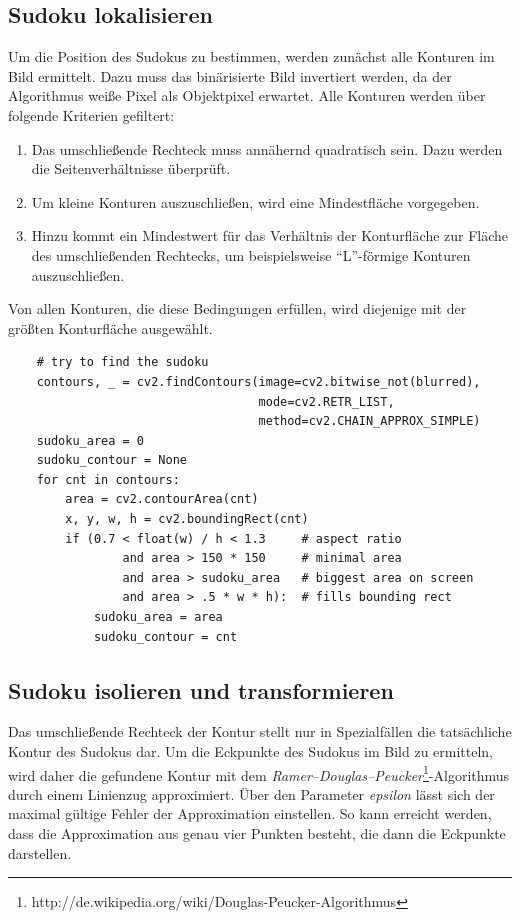 \subsection{Sudoku lokalisieren}
Um die Position des Sudokus zu bestimmen, werden zunächst alle Konturen im Bild ermittelt.
Dazu muss das binärisierte Bild invertiert werden, da der Algorithmus weiße Pixel als Objektpixel erwartet.
Alle Konturen werden über folgende Kriterien gefiltert:

\begin{enumerate}
    \item Das umschließende Rechteck muss annähernd quadratisch sein. Dazu werden die Seitenverhältnisse überprüft.
    \item Um kleine Konturen auszuschließen, wird eine Mindestfläche vorgegeben.
    \item Hinzu kommt ein Mindestwert für das Verhältnis der Konturfläche zur Fläche des umschließenden Rechtecks, um beispielsweise ``L''-förmige Konturen auszuschließen.
\end{enumerate}

Von allen Konturen, die diese Bedingungen erfüllen, wird diejenige mit der größten Konturfläche ausgewählt.

\begin{lstlisting}
    # try to find the sudoku
    contours, _ = cv2.findContours(image=cv2.bitwise_not(blurred),
                                   mode=cv2.RETR_LIST,
                                   method=cv2.CHAIN_APPROX_SIMPLE)
    sudoku_area = 0
    sudoku_contour = None
    for cnt in contours:
        area = cv2.contourArea(cnt)
        x, y, w, h = cv2.boundingRect(cnt)
        if (0.7 < float(w) / h < 1.3     # aspect ratio
                and area > 150 * 150     # minimal area
                and area > sudoku_area   # biggest area on screen
                and area > .5 * w * h):  # fills bounding rect
            sudoku_area = area
            sudoku_contour = cnt
\end{lstlisting}


\subsection{Sudoku isolieren und transformieren}
Das umschließende Rechteck der Kontur stellt nur in Spezialfällen die tatsächliche Kontur des Sudokus dar.
Um die Eckpunkte des Sudokus im Bild zu ermitteln, wird daher die gefundene Kontur mit dem \emph{Ramer–Douglas–Peucker}\footnote{http://de.wikipedia.org/wiki/Douglas-Peucker-Algorithmus}-Algorithmus durch einem Linienzug approximiert.
Über den Parameter \emph{epsilon} lässt sich der maximal gültige Fehler der Approximation einstellen.
So kann erreicht werden, dass die Approximation aus genau vier Punkten besteht, die dann die Eckpunkte darstellen.

